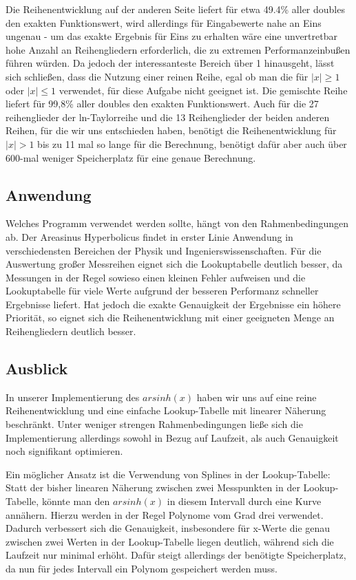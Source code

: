 \documentclass[course=erap] {aspdoc}
\begin{document}
     Die Reihenentwicklung auf der anderen Seite liefert für etwa 49.4\% aller doubles den exakten Funktionswert, wird allerdings für Eingabewerte nahe an Eins ungenau - um das exakte Ergebnis für Eins zu erhalten wäre eine unvertretbar hohe Anzahl an Reihengliedern erforderlich, die zu extremen Performanzeinbußen führen würden. Da jedoch der interessanteste Bereich über 1 hinausgeht, lässt sich schließen, dass die Nutzung einer reinen Reihe, egal ob man die für $|x|\geq1$ oder $|x|\leq1$ verwendet, für diese Aufgabe nicht geeignet ist.
     Die gemischte Reihe liefert für 99,8\% aller doubles den exakten Funktionswert.
     Auch für die 27 reihenglieder der ln-Taylorreihe und die 13 Reihenglieder der beiden anderen Reihen, für die wir uns entschieden haben, benötigt die Reihenentwicklung für $|x|>1$ bis zu 11 mal so lange für die Berechnung, benötigt dafür aber auch über 600-mal weniger Speicherplatz für eine genaue Berechnung.
 
 
     
     \subsection{Anwendung}
     Welches Programm verwendet werden sollte, hängt von den Rahmenbedingungen ab.
     Der Areasinus Hyperbolicus findet in erster Linie Anwendung in verschiedensten Bereichen der Physik und Ingenierswissenschaften.
     Für die Auswertung großer Messreihen eignet sich die Lookuptabelle deutlich besser, da Messungen in der Regel sowieso einen kleinen Fehler aufweisen und die Lookuptabelle für viele Werte aufgrund der besseren Performanz schneller Ergebnisse liefert.
     Hat jedoch die exakte Genauigkeit der Ergebnisse ein höhere Priorität, so eignet sich die Reihenentwicklung mit einer geeigneten Menge an Reihengliedern deutlich besser.
 
     \subsection{Ausblick}
 
     In unserer Implementierung des $arsinh(x)$ haben wir uns auf eine reine Reihenentwicklung und eine einfache Lookup-Tabelle mit linearer Näherung beschränkt.
     Unter weniger strengen Rahmenbedingungen ließe sich die Implementierung allerdings sowohl in Bezug auf Laufzeit, als auch Genauigkeit noch signifikant optimieren. 
     
     Ein möglicher Ansatz ist die Verwendung von Splines in der Lookup-Tabelle: Statt der bisher linearen Näherung zwischen zwei Messpunkten in der Lookup-Tabelle, könnte man den $arsinh(x)$ in diesem Intervall durch eine Kurve annähern.
     Hierzu werden in der Regel Polynome vom Grad drei verwendet.
     Dadurch verbessert sich die Genauigkeit, insbesondere für x-Werte die genau zwischen zwei Werten in der Lookup-Tabelle liegen deutlich, während sich die Laufzeit nur minimal erhöht.
     Dafür steigt allerdings der benötigte Speicherplatz, da nun für jedes Intervall ein Polynom gespeichert werden muss.
     
\end{document}
